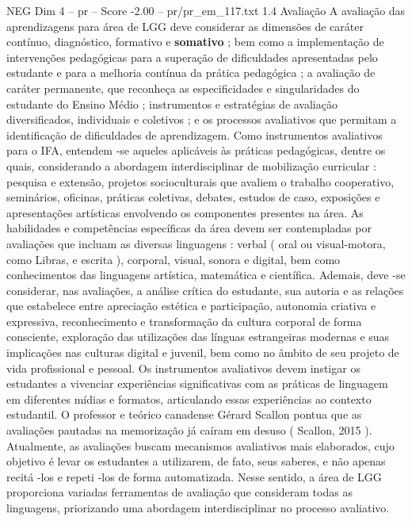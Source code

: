 \begin{textsample}{NEG Dim 4 – pr – Score -2.00 – pr/pr\_em\_117.txt}  \label{ex:f4_neg_106}
1.4 Avaliação A avaliação das aprendizagens para área de LGG deve considerar as dimensões de caráter contínuo, diagnóstico, formativo e \textbf{somativo} ; bem como a implementação de intervenções pedagógicas para a superação de dificuldades apresentadas pelo estudante e para a melhoria contínua da prática pedagógica ; a avaliação de caráter permanente, que reconheça as especificidades e singularidades do estudante do Ensino Médio ; instrumentos e estratégias de avaliação diversificados, individuais e coletivos ; e os processos avaliativos que permitam a identificação de dificuldades de aprendizagem.
Como instrumentos avaliativos para o IFA, entendem -se aqueles aplicáveis às práticas pedagógicas, dentre os quais, considerando a abordagem interdisciplinar de mobilização curricular : pesquisa e extensão, projetos socioculturais que avaliem o trabalho cooperativo, seminários, oficinas, práticas coletivas, debates, estudos de caso, exposições e apresentações artísticas envolvendo os componentes presentes na área.
As habilidades e competências específicas da área devem ser contempladas por avaliações que incluam as diversas linguagens : verbal ( oral ou visual-motora, como Libras, e escrita ), corporal, visual, sonora e digital, bem como conhecimentos das linguagens artística, matemática e científica.
Ademais, deve -se considerar, nas avaliações, a análise crítica do estudante, sua autoria e as relações que estabelece entre apreciação estética e participação, autonomia criativa e expressiva, reconhecimento e transformação da cultura corporal de forma consciente, exploração das utilizações das línguas estrangeiras modernas e suas implicações nas culturas digital e juvenil, bem como no âmbito de seu projeto de vida profissional e pessoal.
Os instrumentos avaliativos devem instigar os estudantes a vivenciar experiências significativas com as práticas de linguagem em diferentes mídias e formatos, articulando essas experiências ao contexto estudantil.
O professor e teórico canadense Gérard Scallon pontua que as avaliações pautadas na memorização já caíram em desuso ( Scallon, 2015 ).
Atualmente, as avaliações buscam mecanismos avaliativos mais elaborados, cujo objetivo é levar os estudantes a utilizarem, de fato, seus saberes, e não apenas recitá -los e repeti -los de forma automatizada.
Nesse sentido, a área de LGG proporciona variadas ferramentas de avaliação que consideram todas as linguagens, priorizando uma abordagem interdisciplinar no processo avaliativo.

\end{textsample}
